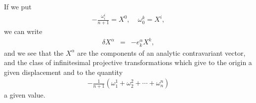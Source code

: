 If we put 
\begin{eqnarray*}
- \frac{ \omega^i_i }{n+1} = X^0, \ \ \ \ \  \omega^k_0 = X^i, 
\end{eqnarray*}
we can write 
\begin{eqnarray*}
\delta X^\alpha &=& - e^\alpha_k X^k ,
\end{eqnarray*}
and we see that the $X^\alpha$ are the components of an analytic contravariant vector, and the class of infinitesimal projective transformations which give to the origin a given displacement and to the quantity
\begin{eqnarray*}
- \frac{ 1}{n+1}(\omega^1_1 +\omega^2_2 + \cdots + \omega^n_n )   
\end{eqnarray*}
a given value.






















































































